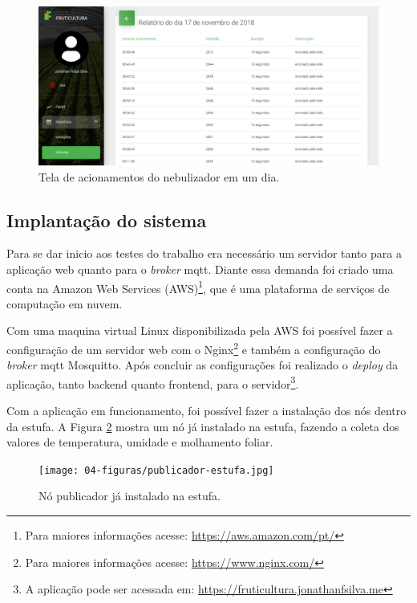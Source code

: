 \begin{figure}[H]
    \centering
    \includegraphics[scale=0.3]{04-figuras/relatorio-valvulas-detalhes.png}
    \caption{Tela de acionamentos do nebulizador em um dia.}
    \vspace{-\baselineskip}
    \label{fig:relatorio-valvulas-detalhes}
\end{figure}

\subsection{Implantação do sistema}
Para se dar inicio aos testes do trabalho era necessário um servidor tanto para a aplicação web quanto para o \textit{broker} mqtt. Diante essa demanda foi criado uma conta na Amazon Web Services (AWS)\footnote[8]{Para maiores informações acesse: \url{https://aws.amazon.com/pt/}}, que é uma plataforma de serviços de computação em nuvem.

Com uma maquina virtual Linux disponibilizada pela AWS foi possível fazer a configuração de um servidor web com o Nginx\footnote[9]{Para maiores informações acesse: \url{https://www.nginx.com/}}
e também a configuração do \textit{broker} mqtt Mosquitto. Após concluir as configurações foi realizado o \textit{deploy} da aplicação, tanto backend quanto frontend, para o servidor\footnote[10]{A aplicação pode ser acessada em: \url{https://fruticultura.jonathanfsilva.me}}.

Com a aplicação em funcionamento, foi possível fazer a instalação dos nós dentro da estufa. A Figura \ref{fig:no-publicador-estufa} mostra um nó já instalado na estufa, fazendo a coleta dos valores de temperatura, umidade e molhamento foliar.

\begin{figure}[H]
    \centering
    \texttt{[image: 04-figuras/publicador-estufa.jpg]}
    \caption{Nó publicador já instalado na estufa.}
    \vspace{-\baselineskip}
    \label{fig:no-publicador-estufa}
\end{figure}